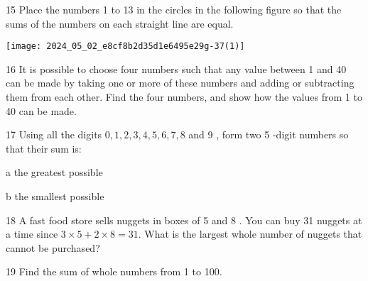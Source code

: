 \documentclass[10pt]{article}
\begin{document}
15 Place the numbers 1 to 13 in the circles in the following figure so that the sums of the numbers on each straight line are equal.

\begin{center}
\texttt{[image: 2024\_05\_02\_e8cf8b2d35d1e6495e29g-37(1)]}
\end{center}

16 It is possible to choose four numbers such that any value between 1 and 40 can be made by taking one or more of these numbers and adding or subtracting them from each other. Find the four numbers, and show how the values from 1 to 40 can be made.

17 Using all the digits \(0,1,2,3,4,5,6,7,8\) and 9 , form two 5 -digit numbers so that their sum is:

a the greatest possible

b the smallest possible

18 A fast food store sells nuggets in boxes of 5 and 8 . You can buy 31 nuggets at a time since \(3 \times 5+2 \times 8=31\). What is the largest whole number of nuggets that cannot be purchased?

19 Find the sum of whole numbers from 1 to 100.
\end{document}
